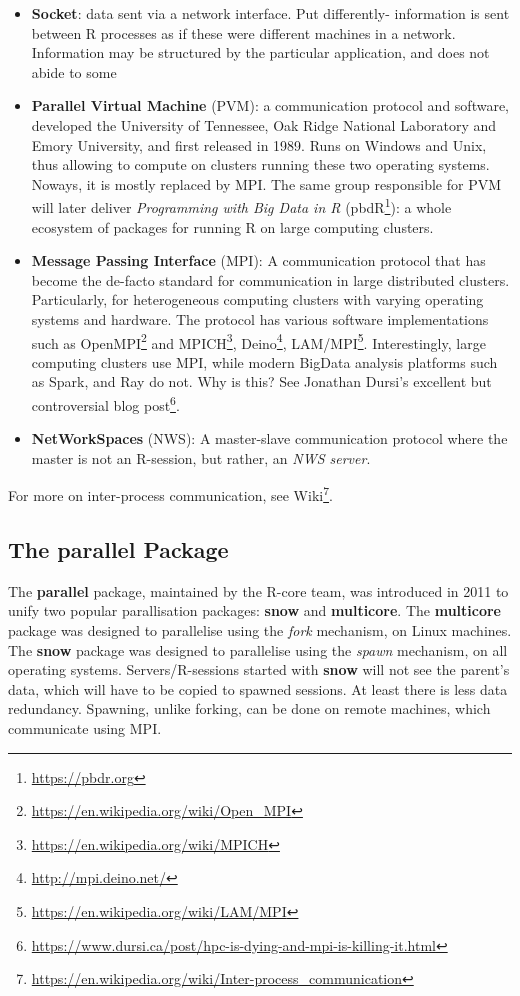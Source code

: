 \documentclass[]{book}
\renewcommand{\href}[2]{#2\footnote{\url{#1}}}
\theoremstyle{definition}
\theoremstyle{definition}
\theoremstyle{definition}
\theoremstyle{remark}
\begin{document}
\begin{itemize}
\item
  \textbf{Socket}: data sent via a network interface. Put differently- information is sent between R processes as if these were different machines in a network. Information may be structured by the particular application, and does not abide to some
\item
  \textbf{Parallel Virtual Machine} (PVM): a communication protocol and software, developed the University of Tennessee, Oak Ridge National Laboratory and Emory University, and first released in 1989. Runs on Windows and Unix, thus allowing to compute on clusters running these two operating systems. Noways, it is mostly replaced by MPI. The same group responsible for PVM will later deliver \emph{Programming with Big Data in R} (\href{https://pbdr.org}{pbdR}): a whole ecosystem of packages for running R on large computing clusters.
\item
  \textbf{Message Passing Interface} (MPI): A communication protocol that has become the de-facto standard for communication in large distributed clusters. Particularly, for heterogeneous computing clusters with varying operating systems and hardware. The protocol has various software implementations such as \href{https://en.wikipedia.org/wiki/Open_MPI}{OpenMPI} and \href{https://en.wikipedia.org/wiki/MPICH}{MPICH}, \href{http://mpi.deino.net/}{Deino}, \href{https://en.wikipedia.org/wiki/LAM/MPI}{LAM/MPI}. Interestingly, large computing clusters use MPI, while modern BigData analysis platforms such as Spark, and Ray do not. Why is this? See Jonathan Dursi's excellent but controversial \href{https://www.dursi.ca/post/hpc-is-dying-and-mpi-is-killing-it.html}{blog post}.
\item
  \textbf{NetWorkSpaces} (NWS): A master-slave communication protocol where the master is not an R-session, but rather, an \emph{NWS server}.
\end{itemize}

For more on inter-process communication, see \href{https://en.wikipedia.org/wiki/Inter-process_communication}{Wiki}.

\hypertarget{the-parallel-package}{%
\subsection{The parallel Package}\label{the-parallel-package}}

The \textbf{parallel} package, maintained by the R-core team, was introduced in 2011 to unify two popular parallisation packages: \textbf{snow} and \textbf{multicore}.
The \textbf{multicore} package was designed to parallelise using the \emph{fork} mechanism, on Linux machines.
The \textbf{snow} package was designed to parallelise using the \emph{spawn} mechanism, on all operating systems.
Servers/R-sessions started with \textbf{snow} will not see the parent's data, which will have to be copied to spawned sessions.
At least there is less data redundancy.
Spawning, unlike forking, can be done on remote machines, which communicate using MPI.
\end{document}
